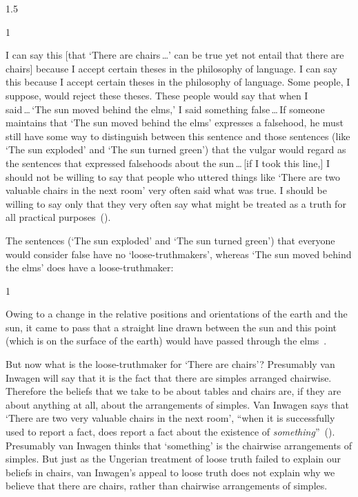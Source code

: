 \documentclass[11pt]{standalone}
\newenvironment{squote}{%
\begin{spacing}{1}
       	\begin{list}{}{%
\setlength{\labelwidth}{0pt}%
\rightmargin\leftmargin%
}
\item\relax
}{%
\end{list}%
\end{spacing}
}
\begin{document}
\begin{spacing}{1.5}
\begin{squote}
I can say this [that `There are chairs\,\ldots ' can be true yet not
  entail that there are chairs] because I accept certain theses in the
philosophy of language.  I can say this because I accept certain
theses in the philosophy of language.  Some people, I suppose, would
reject these theses.  These people would say that when I
said\,\ldots\,`The sun moved behind the elms,' I said something
false\,\ldots\,If someone maintains that `The sun moved behind the
elms' expresses a falsehood, he must still have some way to
distinguish between this sentence and those sentences (like `The sun
exploded' and `The sun turned green') that the vulgar would regard as
the sentences that expressed falsehoods about the sun\,\ldots\,[if I
  took this line,] I should not be willing to say that people who
uttered things like `There are two valuable chairs in the next room'
very often said what was true.  I should be willing to say only that
they very often say what might be treated as a truth for all practical
purposes~(\citeyear[102--103]{inwagen1995}).
\end{squote}
The sentences (`The sun exploded' and `The sun turned green') that
everyone would consider false have no `loose-truthmakers', whereas
`The sun moved behind the elms' does have a loose-truthmaker:
\begin{squote}
Owing to a change in the relative positions and orientations of the
earth and the sun, it came to pass that a straight line drawn between
the sun and this point (which is on the surface of the earth) would
have passed through the elms~\citep[112--113]{inwagen1995}.
\end{squote}

But now what is the loose-truthmaker for `There are chairs'?
Presumably van Inwagen will say that it is the fact that there are
simples arranged chairwise.  Therefore the beliefs that we take to be
about tables and chairs are, if they are about anything at all, about
the arrangements of simples.  Van Inwagen says that `There are two
very valuable chairs in the next room', ``when it is successfully used
to report a fact, does report a fact about the existence of {\em
  something}''~(\citeyear[102]{inwagen1995}).  Presumably van Inwagen
thinks that `something' is the chairwise arrangements of simples.  But
just as the Ungerian treatment of loose truth failed to explain our
beliefs in chairs, van Inwagen's appeal to loose truth does not
explain why we believe that there are chairs, rather than chairwise
arrangements of simples.


\end{spacing}
\end{document}
